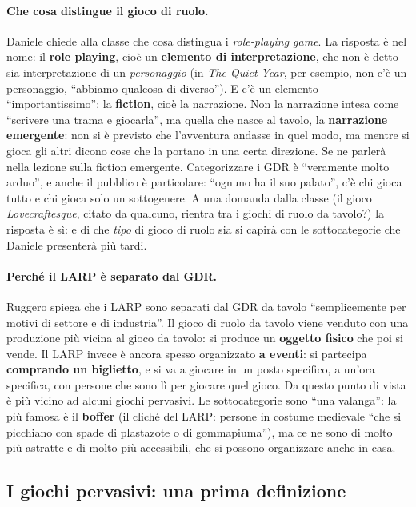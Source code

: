 \paragraph{Che cosa distingue il gioco di ruolo.} Daniele chiede alla classe
che cosa distingua i \emph{role-playing game}. La risposta è nel nome: il
\textbf{role playing}, cioè un \textbf{elemento di interpretazione}, che non è
detto sia interpretazione di un \emph{personaggio} (in \emph{The Quiet Year},
per esempio, non c'è un personaggio, ``abbiamo qualcosa di diverso''). E c'è un
elemento ``importantissimo'': la \textbf{fiction}, cioè la narrazione. Non la
narrazione intesa come ``scrivere una trama e giocarla'', ma quella che nasce al
tavolo, la \textbf{narrazione emergente}: non si è previsto che l'avventura
andasse in quel modo, ma mentre si gioca gli altri dicono cose che la portano in
una certa direzione. Se ne parlerà nella lezione sulla fiction emergente.
Categorizzare i GDR è ``veramente molto arduo'', e anche il pubblico è
particolare: ``ognuno ha il suo palato'', c'è chi gioca tutto e chi gioca solo un
sottogenere. A una domanda dalla classe (il gioco \emph{Lovecraftesque}, citato
da qualcuno, rientra tra i giochi di ruolo da tavolo?) la risposta è sì: e di
che \emph{tipo} di gioco di ruolo sia si capirà con le sottocategorie che Daniele
presenterà più tardi.

\paragraph{Perché il LARP è separato dal GDR.} Ruggero spiega che i LARP sono
separati dal GDR da tavolo ``semplicemente per motivi di settore e di
industria''. Il gioco di ruolo da tavolo viene venduto con una produzione più
vicina al gioco da tavolo: si produce un \textbf{oggetto fisico} che poi si
vende. Il LARP invece è ancora spesso organizzato \textbf{a eventi}: si partecipa
\textbf{comprando un biglietto}, e si va a giocare in un posto specifico, a
un'ora specifica, con persone che sono lì per giocare quel gioco. Da questo
punto di vista è più vicino ad alcuni giochi pervasivi. Le sottocategorie sono
``una valanga'': la più famosa è il \textbf{boffer} (il cliché del LARP: persone
in costume medievale ``che si picchiano con spade di plastazote o di gommapiuma''),
ma ce ne sono di molto più astratte e di molto più accessibili, che si possono
organizzare anche in casa.

\subsection{I giochi pervasivi: una prima definizione}

